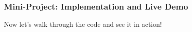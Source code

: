 \begin{frame}
\frametitle{Mini-Project: Implementation and Live Demo}

\begin{center}
Now let's walk through the code and see it in action!
\end{center}

\end{frame}